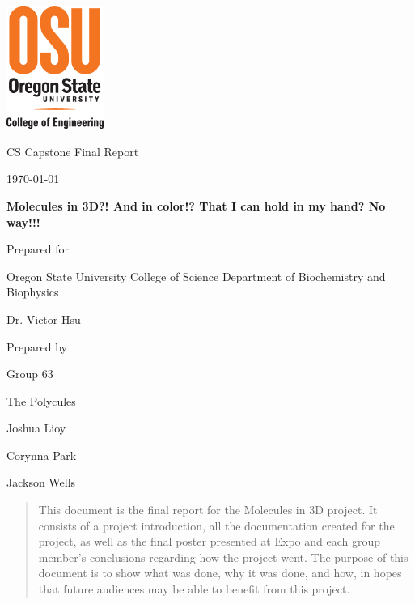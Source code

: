 \documentclass[letterpaper, onecolumn, draftclsnofoot, 10pt, compsoc]{IEEEtran}
\def \CapstoneTeamName{			The Polycules}
\def \CapstoneTeamNumber{		63}
\def \GroupMemberOne{			Joshua Lioy}
\def \GroupMemberTwo{			Corynna Park}
\def \GroupMemberThree{			Jackson Wells}
\def \CapstoneProjectName{		Molecules in 3D?! And in color!? That I can hold in my hand? No way!!!}
\def \CapstoneSponsorCompany{	Oregon State University College of Science Department of Biochemistry and Biophysics}
\def \CapstoneSponsorPerson{	Dr. Victor Hsu}
\def \DocType{	%
				Final Report
				}
\newcommand{\NameSigPair}[1]{\par
\makebox[2.75in][r]{#1} \hfil 	\makebox[3.25in]{\makebox[2.25in]{\hrulefill} \hfill		\makebox[.75in]{\hrulefill}}
\par\vspace{-12pt} \textit{\tiny\noindent
\makebox[2.75in]{} \hfil		\makebox[3.25in]{\makebox[2.25in][r]{Signature} \hfill	\makebox[.75in][r]{Date}}}}
\renewcommand{\NameSigPair}[1]{#1}
\begin{document}
\begin{titlepage}
    \begin{singlespace}
    	\includegraphics[height=4cm]{coe_v_spot1}
        \hfill 
        \par\vspace{.2in}
        \centering
        \scshape{
            \huge CS Capstone \DocType \par
            {\large\today}\par
            \vspace{.5in}
            \textbf{\Huge\CapstoneProjectName}\par
            \vfill
            {\large Prepared for}\par
            \Huge \CapstoneSponsorCompany\par
            \vspace{5pt}
            {\Large\NameSigPair{\CapstoneSponsorPerson}\par}
            {\large Prepared by }\par
            Group\CapstoneTeamNumber\par
            \CapstoneTeamName\par 
            \vspace{5pt}
            {\Large
                \NameSigPair{\GroupMemberOne}\par
                \NameSigPair{\GroupMemberTwo}\par
                \NameSigPair{\GroupMemberThree}\par
            }
            \vspace{20pt}
        }
        \begin{abstract}
            This document is the final report for the Molecules in 3D project. 
            It consists of a project introduction, all the documentation created for the project, as well as the final poster presented at Expo and each group member's conclusions regarding how the project went.
            The purpose of this document is to show what was done, why it was done, and how, in hopes that future audiences may be able to benefit from this project.   
        \end{abstract}     
    \end{singlespace}
\end{titlepage}
\newpage
{}
\end{document}
